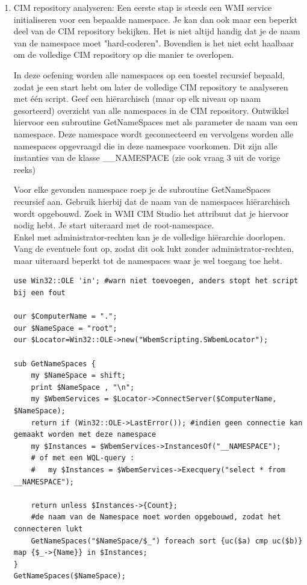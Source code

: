 \documentclass[11pt,a4paper]{report}
\begin{document}
\begin{enumerate}[resume]
\begin{lstlisting}
#Alternatief voor het ophalen van de waarden van het attribute DeviceID :
@DeviceId=map{$_->{DeviceID}} in $Instances;
print "\n",scalar (@DeviceId), " netwerkadapters met sleutelattribuut: \n\t DeviceID=";
print join("\n\t DeviceId=",@DeviceId);
	\end{lstlisting}
	\item CIM repository analyseren: Een eerste stap is steeds een WMI service initialiseren voor een bepaalde namespace. Je kan dan ook maar een beperkt deel van de CIM repository bekijken. Het is niet altijd handig dat je de naam van de namespace moet "hard-coderen". Bovendien is het niet echt haalbaar om de volledige CIM repository op die manier te overlopen.
	\par In deze oefening worden alle namespaces op een toestel recursief bepaald, zodat je een start hebt om later de volledige CIM repository te analyseren met één script.
	Geef een hiërarchisch (maar op elk niveau op naam gesorteerd) overzicht van alle namespaces in de CIM repository. Ontwikkel hiervoor een subroutine GetNameSpaces met als parameter de naam van een namespace. Deze namespace wordt geconnecteerd en vervolgens worden alle namespaces opgevraagd die in deze namespace voorkomen. Dit zijn alle instanties van de klasse \_\_NAMESPACE (zie ook vraag 3 uit de vorige reeks)
	\par Voor elke gevonden namespace roep je de subroutine GetNameSpaces recursief aan. Gebruik hierbij dat de naam van de namespaces hiërarchisch wordt opgebouwd. Zoek in WMI CIM Studio het attribuut dat je hiervoor nodig hebt. Je start uiteraard met de root-namespace.
	\\Enkel met administrator-rechten kan je de volledige hiërarchie doorlopen. Vang de eventuele fout op, zodat dit ook lukt zonder administrator-rechten, maar uiteraard beperkt tot de namespaces waar je wel toegang toe hebt.
	\begin{lstlisting}
use Win32::OLE 'in'; #warn niet toevoegen, anders stopt het script bij een fout

our $ComputerName = ".";
our $NameSpace = "root";
our $Locator=Win32::OLE->new("WbemScripting.SWbemLocator");

sub GetNameSpaces {
	my $NameSpace = shift;
	print $NameSpace , "\n";
	my $WbemServices = $Locator->ConnectServer($ComputerName, $NameSpace);
	return if (Win32::OLE->LastError()); #indien geen connectie kan gemaakt worden met deze namespace
	my $Instances = $WbemServices->InstancesOf("__NAMESPACE");
	# of met een WQL-query :
	#   my $Instances = $WbemServices->Execquery("select * from __NAMESPACE");
	
	return unless $Instances->{Count};
	#de naam van de Namespace moet worden opgebouwd, zodat het connecteren lukt
	GetNameSpaces("$NameSpace/$_") foreach sort {uc($a) cmp uc($b)} map {$_->{Name}} in $Instances;
}
GetNameSpaces($NameSpace);
	\end{lstlisting}
\end{enumerate}
\end{document}
